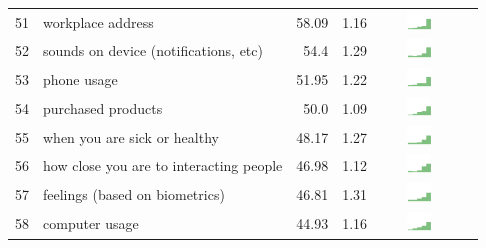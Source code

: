 \begin{table}[t]
\begin{center}
\begin{tabular}{| r | l | r | r | r | r |}
51 & workplace address & 58.09 & 1.16 &\includegraphics[width = 2cm, height = 0.5cm]{tex-inputs/table-images/learnedwhereyouworksomehowcombined} \\ 
52 & sounds on device (notifications, etc) & 54.4 & 1.29 &  \includegraphics[width = 2cm, height = 0.5cm]{tex-inputs/table-images/copiedanduploadedsoundssavedonyourdevice(notificationnoisesetc)combined} \\ 
53 & phone usage & 51.95 &1.22 &  \includegraphics[width = 2cm, height = 0.5cm]{tex-inputs/table-images/learnedhowmuchyouuseyourphonecombined} \\ 
54 & purchased products & 50.0 & 1.09 & \includegraphics[width = 2cm, height = 0.5cm]{tex-inputs/table-images/learnedwhatproductsyoubuycombined} \\ 
55 & when you are sick or healthy & 48.17  & 1.27 & \includegraphics[width = 2cm, height = 0.5cm]{tex-inputs/table-images/learnedwhenyouaresickorhealthycombined} \\ 
56 & how close you are to interacting people & 46.98 & 1.12 & \includegraphics[width = 2cm, height = 0.5cm]{tex-inputs/table-images/learnedhowcloseyouaretootherpeopleyouinteractwithcombined} \\ 
57 & feelings (based on biometrics) & 46.81 & 1.31 & \includegraphics[width = 2cm, height = 0.5cm]{tex-inputs/table-images/learnedhowyouwerefeelingbasedonheartratebreathingandortemperaturecombined} \\ 
58 & computer usage & 44.93 & 1.16 & \includegraphics[width = 2cm, height = 0.5cm]{tex-inputs/table-images/learnedhowmuchyouuseyourcomputercombined} \\ 

\end{tabular}
\end{center}
\end{table}
